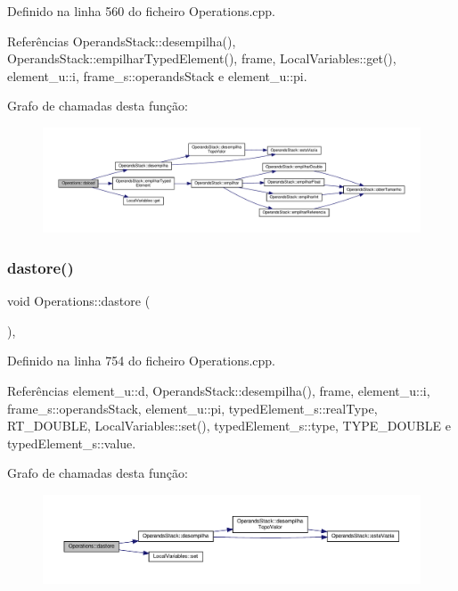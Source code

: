 Definido na linha 560 do ficheiro Operations.\+cpp.



Referências Operands\+Stack\+::desempilha(), Operands\+Stack\+::empilhar\+Typed\+Element(), frame, Local\+Variables\+::get(), element\+\_\+u\+::i, frame\+\_\+s\+::operands\+Stack e element\+\_\+u\+::pi.

Grafo de chamadas desta função\+:\nopagebreak
\begin{figure}[H]
\begin{center}
\leavevmode
\includegraphics[width=350pt]{classOperations_a63691de547749780c372e285bd6a97bc_cgraph}
\end{center}
\end{figure}
\mbox{\label{classOperations_a9735fdb8ba4ea2d7b8b32e8d0a5d2f72}} 
\subsubsection{\texorpdfstring{dastore()}{dastore()}}
{\footnotesize\ttfamily void Operations\+::dastore (\begin{DoxyParamCaption}{ }\end{DoxyParamCaption})\hspace{0.3cm}{\ttfamily [static]}, {\ttfamily [private]}}



Definido na linha 754 do ficheiro Operations.\+cpp.



Referências element\+\_\+u\+::d, Operands\+Stack\+::desempilha(), frame, element\+\_\+u\+::i, frame\+\_\+s\+::operands\+Stack, element\+\_\+u\+::pi, typed\+Element\+\_\+s\+::real\+Type, R\+T\+\_\+\+D\+O\+U\+B\+LE, Local\+Variables\+::set(), typed\+Element\+\_\+s\+::type, T\+Y\+P\+E\+\_\+\+D\+O\+U\+B\+LE e typed\+Element\+\_\+s\+::value.

Grafo de chamadas desta função\+:\nopagebreak
\begin{figure}[H]
\begin{center}
\leavevmode
\includegraphics[width=350pt]{classOperations_a9735fdb8ba4ea2d7b8b32e8d0a5d2f72_cgraph}
\end{center}
\end{figure}
\mbox{\label{classOperations_a7c2a5194de7a2a59ada752001b8ece0a}} 
